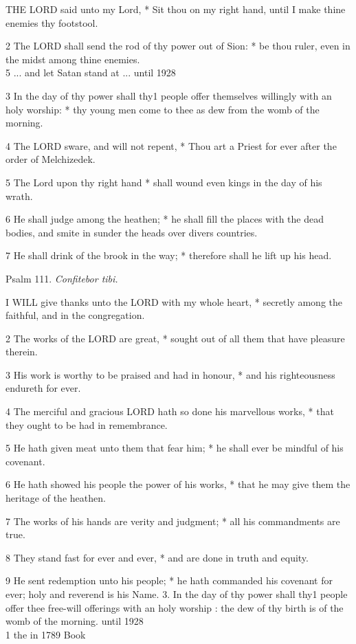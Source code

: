 THE
LORD said unto my Lord, * Sit thou on my right hand, until I make thine
enemies thy footstool.

2 The LORD shall send the rod of thy power out of Sion:
* be thou ruler, even in the midst among thine enemies. \\
5 ... and let Satan stand at
...
until 1928

3 In the day of thy power shall thy1 people offer themselves
willingly with an holy worship: * thy young men come to thee as dew from
the womb of the morning.

4 The LORD sware, and will not repent, * Thou art a
Priest for ever after the order of Melchizedek.

5 The Lord upon thy right hand * shall wound even kings
in the day of his wrath.

6 He shall judge among the heathen; * he shall fill
the places with the dead bodies, and smite in sunder the heads over divers
countries.

7 He shall drink of the brook in the way; * therefore
shall he lift up his head.

Psalm
111. \emph{Confitebor tibi.}

I
WILL give thanks unto the LORD with my whole heart, * secretly among the
faithful, and in the congregation.

2 The works of the LORD are great, * sought out of
all them that have pleasure therein.

3 His work is worthy to be praised and had in honour,
* and his righteousness endureth for ever.

4 The merciful and gracious LORD hath so done his marvellous
works, * that they ought to be had in remembrance.

5 He hath given meat unto them that fear him; * he
shall ever be mindful of his covenant.

6 He hath showed his people the power of his works,
* that he may give them the heritage of the heathen.

7 The works of his hands are verity and judgment; *
all his commandments are true.

8 They stand fast for ever and ever, * and are done
in truth and equity.

9 He sent redemption unto his people; * he hath commanded
his covenant for ever; holy and reverend is his Name. 3. In the day of thy power
shall thy1 people offer thee free-will offerings with an holy
worship : the dew of thy birth is of the womb of the morning.
until 1928\\
1
the in
1789 Book


